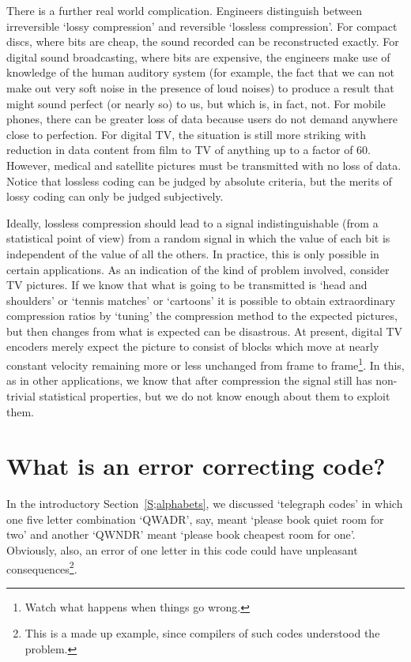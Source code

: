 \documentclass[12pt,a4paper]{article}
\theoremstyle{plain}
\theoremstyle{definition}
\begin{document}
    There is a further real world complication.
    Engineers
    distinguish between irreversible
    `lossy compression'
    and reversible `lossless compression'.
    For compact discs, where bits are cheap,
    the sound recorded can be reconstructed
    exactly. For digital sound broadcasting, where
    bits are expensive, the engineers make use
    of knowledge of the human auditory system
    (for example, the fact that we can not
    make out very soft noise in the presence
    of loud noises) to produce a result that might
    sound perfect (or nearly so) to us, but which
    is, in fact, not. For mobile phones, there can be
    greater loss of data because users
    do not demand anywhere close to
    perfection.
    For digital TV, the situation is still more
    striking with reduction in data content from
    film to TV of anything up to a factor of 60.
    However, medical and satellite pictures must
    be transmitted with no loss of data.
    Notice that lossless coding can be judged by
    absolute criteria, but the merits of lossy
    coding can only be judged subjectively.

    Ideally, lossless compression should
    lead to a signal indistinguishable (from a statistical
    point of view) from a random signal
    in which the value of each bit is independent
    of the value of all the others.
    In practice, this is only possible in certain
    applications. As an indication of the kind of
    problem involved, consider TV pictures. If
    we know that what is going to be transmitted is
    `head and shoulders' or `tennis matches' or
    `cartoons' it is possible to obtain extraordinary
    compression ratios by `tuning' the compression method
    to the expected pictures, but then changes from
    what is expected can be disastrous. At present,
    digital TV encoders merely expect the picture to
    consist of blocks which move at nearly constant
    velocity remaining more or less unchanged from
    frame to frame\footnote{Watch what happens when
    things go wrong.}. In this, as in other applications,
    we know that after compression
    the signal still has non-trivial
    statistical properties,
    but we do not know
    enough about them to exploit them.
    \section{What is an error correcting code?}
    In the introductory Section~\ref{S;alphabets},
    we discussed `telegraph codes' in which
    one five letter
    combination `QWADR', say, meant `please book
    quiet room for two' and another `QWNDR' meant
    `please book cheapest room for one'.
    Obviously, also, an error of one letter
    in this code could have unpleasant
    consequences\footnote{This is a made up example,
    since compilers of such codes understood the problem.}.
\end{document}
